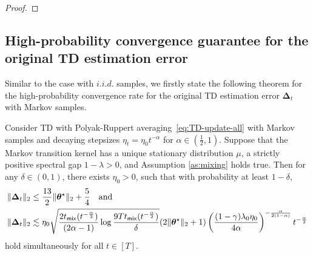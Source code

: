 \begin{proof}

\end{proof}


\subsection{High-probability convergence guarantee for the original TD estimation error}\label{app:proof-TD-original}
Similar to the case with $i.i.d.$ samples, we firstly state the following theorem for the high-probability convergence rate for the original TD estimation error $\bm{\Delta}_t$ with Markov samples.
\begin{theorem}
\label{thm:markov-deltat-convergence}
Consider TD with Polyak-Ruppert averaging~\eqref{eq:TD-update-all} with Markov samples and decaying stepsizes $\eta_t = \eta_0 t^{-\alpha}$ for $\alpha \in (\frac{1}{2},1)$. Suppose that the Markov transition kernel has a unique stationary distribution $\mu$, a strictly positive spectral gap $1-\lambda > 0$, and Assumption \ref{as:mixing} holds true. Then for any $\delta \in (0,1)$, there exists $\eta_0 > 0$, such that with probability at least $1-{\delta}$,
\begin{align*}
\|\bm{\Delta}_t\|_2 &\leq \frac{13}{2}\|\bm{\theta}^\star\|_2 + \frac{5}{4} \quad \text{and}\\
\|\bm{\Delta}_t\|_2 &\lesssim \eta_0 \sqrt{\frac{2t_{\mathsf{mix}}(t^{-\frac{\alpha}{2}})}{(2\alpha-1)}\log \frac{9Tt_{\mathsf{mix}}(t^{-\frac{\alpha}{2}})}{\delta}}(2\|\bm{\theta}^\star\|_2  + 1)\left(\frac{(1-\gamma)\lambda_0 \eta_0}{4\alpha}\right)^{-\frac{\alpha}{2(1-\alpha)}}t^{-\frac{\alpha}{2}}
\end{align*}
hold simultaneously for all $t \in [T]$.
\end{theorem}

